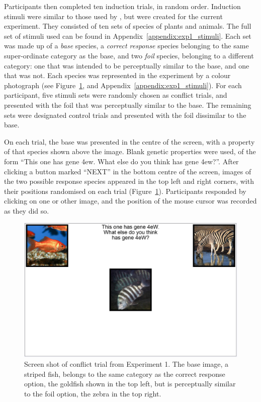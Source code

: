 Participants then completed ten induction trials, in random order.
Induction stimuli were similar to those used by \citet{Gelman1986},
but were created for the current experiment.
They consisted of ten sets of species of plants and animals.
The full set of stimuli used can be found in Appendix~\ref{appendix:exp1_stimuli}.
Each set was made up of a \emph{base} species,
a \emph{correct response} species belonging to
the same super-ordinate category as the base,
and two \emph{foil} species, belonging to a different category:
one that was intended to be
perceptually similar to the base, and one that was not.
Each species was represented in the experiment
by a colour photograph (see Figure~\ref{fig:exp1-screenshot1},
and Appendix~\ref{appendix:exp1_stimuli}).
For each participant, five stimuli sets were randomly chosen as
conflict trials, and presented with the foil
that was perceptually similar to the base.
The remaining sets were designated control trials
and presented with the foil dissimilar to the base.

On each trial, the base was presented
in the centre of the screen,
with a property of that species shown above the image.
Blank genetic properties were used, of the form
``This one has gene 4ew. What else do you think has gene 4ew?''.
After clicking a button marked ``NEXT'' in the bottom centre of the screen,
images of the two possible response species
appeared in the top left and right corners,
with their positions randomised on each trial
(Figure~\ref{fig:exp1-screenshot1}).
Participants responded by clicking on one or other image,
and the position of the mouse cursor was recorded as they did so.

\begin{figure}[pt]
  \centering
  \includegraphics[width=.8\textwidth]{imgs/natural_conflict.png}
  \caption[Screen shot of conflict trial from Experiment 1.]{
    Screen shot of conflict trial from Experiment 1.
    The base image, a striped fish, belongs to the same category as the
    correct response option, the goldfish shown in the top left,
    but is perceptually similar to the foil option,
    the zebra in the top right.}
  \label{fig:exp1-screenshot1}
\end{figure}

